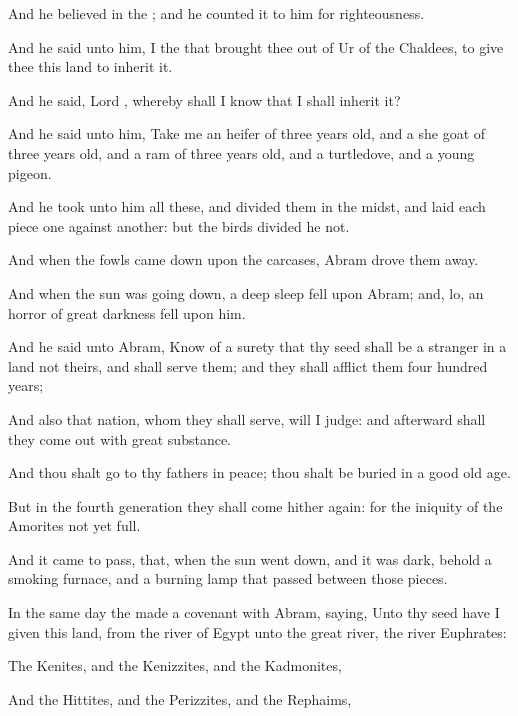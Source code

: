 {And he
believed in the
{}; and he
counted it to him for
righteousness.


\par }{\PP {}And he
said unto him, I
{} the
{} that brought thee
out of
Ur of the
Chaldees, to
give thee this
land to
inherit it.

And he
said,
Lord
{},
whereby shall I
know that I shall inherit
it?

And he
said unto him,
Take me an
heifer of three years
old, and a she
goat of three years
old, and a
ram of three years
old, and a
turtledove, and a young
pigeon.

And he
took unto him all these, and
divided them in the
midst, and
laid
each
piece one
against
another: but the
birds
divided he not.

And when the
fowls came
down upon the
carcases,
Abram drove them
away.


\par }{\PP {}And when the
sun was going
down, a deep
sleep
fell upon
Abram; and, lo, an
horror of
great
darkness
fell upon him.

And he
said unto
Abram,
Know of a
surety that thy
seed shall be a
stranger in a
land
{} not theirs, and shall
serve them; and they shall
afflict them
four
hundred
years;

And also that
nation, whom they shall
serve, will I
judge: and
afterward shall they come
out with
great
substance.

And thou shalt
go to thy
fathers in
peace; thou shalt be
buried in a
good old
age.

But in the
fourth
generation they shall come
hither
again: for the
iniquity of the
Amorites
{} not
yet
full.


\par }{\PP {}And it came to pass, that, when the
sun went
down, and it was
dark, behold a
smoking
furnace, and a
burning
lamp that
passed
between those
pieces.

In the
same
day the
{}
made a
covenant with
Abram,
saying, Unto thy
seed have I
given this
land, from the
river of
Egypt unto the
great
river, the
river
Euphrates:

The
Kenites, and the
Kenizzites, and the
Kadmonites,

And the
Hittites, and the
Perizzites, and the
Rephaims,

}
